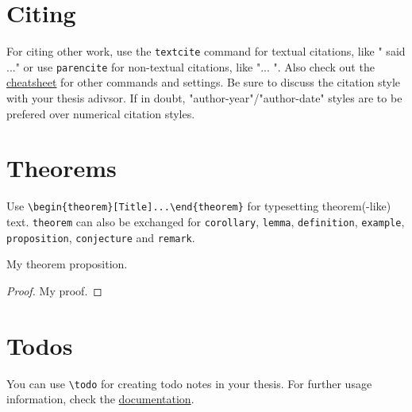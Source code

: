 \section{Citing}

For citing other work, use the \verb|textcite| command for textual citations, like "\textcite{brachthäuserBoxing} said ..." or use \verb|parencite| for non-textual citations, like "... \parencite{brachthäuserBoxing}".
Also check out the \href{https://tug.ctan.org/info/biblatex-cheatsheet/biblatex-cheatsheet.pdf}{cheatsheet} for other commands and settings.
Be sure to discuss the citation style with your thesis adivsor.
If in doubt, "author-year"/"author-date" styles are to be prefered over numerical citation styles.

\section{Theorems}

Use \verb|\begin{theorem}[Title]...\end{theorem}| for typesetting theorem(-like) text.
\verb|theorem| can also be exchanged for \verb|corollary|, \verb|lemma|, \verb|definition|, \verb|example|, \verb|proposition|, \verb|conjecture| and \verb|remark|.
\begin{theorem}[My Theorem]
    My theorem proposition.
\end{theorem}
\begin{proof}
    My proof.
\end{proof}

\section{Todos}

You can use \verb|\todo| for creating todo notes in your thesis.
For further usage information, check the \href{https://tug.ctan.org/macros/latex/contrib/todonotes/todonotes.pdf}{documentation}.
